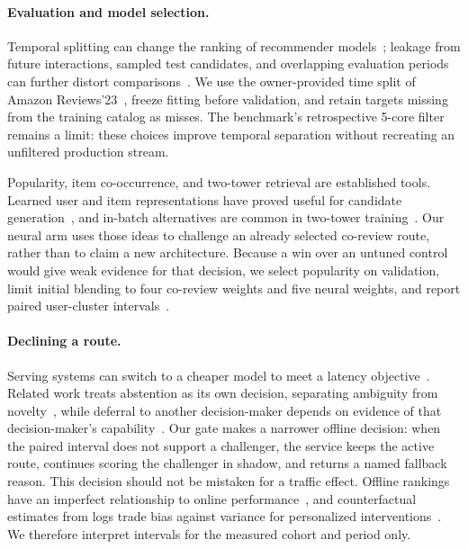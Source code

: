 \documentclass[11pt]{article}
\begin{document}
\paragraph{Evaluation and model selection.}
Temporal splitting can change the ranking of recommender models~\cite{meng2020splitting}; leakage from future interactions, sampled test candidates, and overlapping evaluation periods can further distort comparisons~\cite{ji2023leakage,gusak2025time,hidasi2023flaws}. We use the owner-provided time split of Amazon Reviews'23~\cite{hou2026bridging,amazon5core}, freeze fitting before validation, and retain targets missing from the training catalog as misses. The benchmark's retrospective 5-core filter remains a limit: these choices improve temporal separation without recreating an unfiltered production stream.

Popularity, item co-occurrence, and two-tower retrieval are established tools. Learned user and item representations have proved useful for candidate generation~\cite{covington2016youtube}, and in-batch alternatives are common in two-tower training~\cite{wang2021crossbatch}. Our neural arm uses those ideas to challenge an already selected co-review route, rather than to claim a new architecture. Because a win over an untuned control would give weak evidence for that decision, we select popularity on validation, limit initial blending to four co-review weights and five neural weights, and report paired user-cluster intervals~\cite{schnabel2022here}.

\paragraph{Declining a route.}
Serving systems can switch to a cheaper model to meet a latency objective~\cite{crankshaw2016clipper}. Related work treats abstention as its own decision, separating ambiguity from novelty~\cite{hendrickx2021reject}, while deferral to another decision-maker depends on evidence of that decision-maker's capability~\cite{hemmer2023defer}. Our gate makes a narrower offline decision: when the paired interval does not support a challenger, the service keeps the active route, continues scoring the challenger in shadow, and returns a named fallback reason. This decision should not be mistaken for a traffic effect. Offline rankings have an imperfect relationship to online performance~\cite{krauth2020offline}, and counterfactual estimates from logs trade bias against variance for personalized interventions~\cite{gilotte2018offline}. We therefore interpret intervals for the measured cohort and period only.
\end{document}
